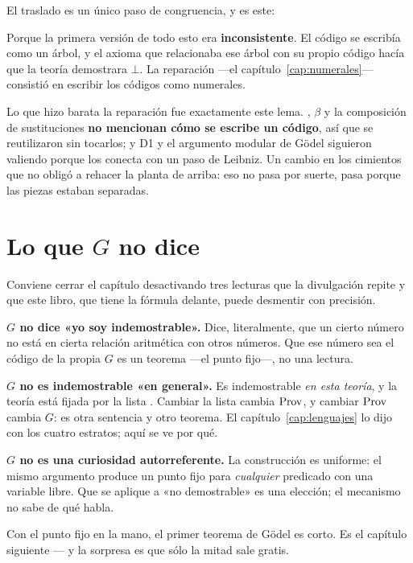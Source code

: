 
El traslado es un único paso de congruencia, y es este:



\begin{leccion}
Porque la primera versión de todo esto era \textbf{inconsistente}. El código se escribía como un
árbol, y el axioma que relacionaba ese árbol con su propio código hacía que la teoría demostrara
$\bot$. La reparación —el capítulo~\ref{cap:numerales}— consistió en escribir los códigos como
numerales.

Lo que hizo barata la reparación fue exactamente este lema. , $\beta$ y la
composición de sustituciones \textbf{no mencionan cómo se escribe un código}, así que se
reutilizaron sin tocarlos; y D1 y el argumento modular de Gödel siguieron valiendo porque
 los conecta con un paso de Leibniz. Un cambio en los cimientos que no
obligó a rehacer la planta de arriba: eso no pasa por suerte, pasa porque las piezas estaban
separadas.
\end{leccion}

\section{Lo que \texorpdfstring{$G$}{G} no dice}

Conviene cerrar el capítulo desactivando tres lecturas que la divulgación repite y que este
libro, que tiene la fórmula delante, puede desmentir con precisión.

\begin{muro}
\textbf{$G$ no dice «yo soy indemostrable».} Dice, literalmente, que un cierto número no está en
cierta relación aritmética con otros números. Que ese número sea el código de la propia $G$ es un
teorema —el punto fijo—, no una lectura.

\textbf{$G$ no es indemostrable «en general».} Es indemostrable \emph{en esta teoría}, y la teoría
está fijada por la lista . Cambiar la lista cambia $\operatorname{Prov}$, y cambiar $\operatorname{Prov}$ cambia
$G$: es otra sentencia y otro teorema. El capítulo~\ref{cap:lenguajes} lo dijo con los cuatro
estratos; aquí se ve por qué.

\textbf{$G$ no es una curiosidad autorreferente.} La construcción es uniforme: el mismo argumento
produce un punto fijo para \emph{cualquier} predicado con una variable libre. Que se aplique a
«no demostrable» es una elección; el mecanismo no sabe de qué habla.
\end{muro}

Con el punto fijo en la mano, el primer teorema de Gödel es corto. Es el capítulo siguiente — y la
sorpresa es que sólo la mitad sale gratis.
